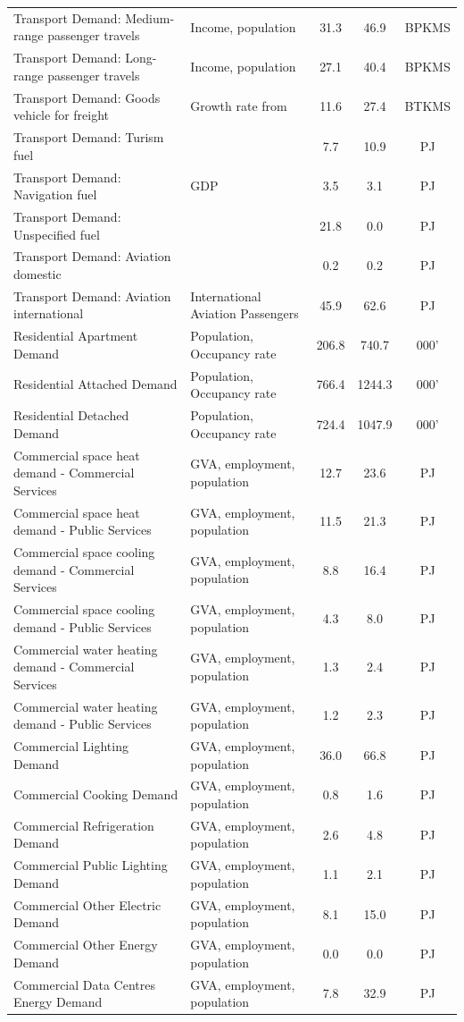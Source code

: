 \documentclass[journal abbreviation, manuscript]{copernicus}
\begin{document}
\begin{table}[htbp]
{\begin{tabular}{p{18em}lccc}
 Transport Demand: Medium-range passenger travels & Income, population & 31.3 & 46.9 & BPKMS \\
 Transport Demand: Long-range passenger travels & Income, population & 27.1 & 40.4 & BPKMS \\
 Transport Demand: Goods vehicle for freight & Growth rate from \cite{yan2020freight} & 11.6 & 27.4 & BTKMS \\
 Transport Demand: Turism fuel & & 7.7 & 10.9 & PJ \\
 Transport Demand: Navigation fuel & GDP & 3.5 & 3.1 & PJ \\
 Transport Demand: Unspecified fuel & & 21.8 & 0.0 & PJ \\
 Transport Demand: Aviation domestic & & 0.2 & 0.2 & PJ \\
 Transport Demand: Aviation international & International Aviation Passengers & 45.9 & 62.6 & PJ \\
 Residential Apartment Demand & Population, Occupancy rate & 206.8 & 740.7 & 000' \\
 Residential Attached Demand & Population, Occupancy rate & 766.4 & 1244.3 & 000' \\
 Residential Detached Demand & Population, Occupancy rate & 724.4 & 1047.9 & 000' \\
 Commercial space heat demand - Commercial Services & GVA, employment, population & 12.7 & 23.6 & PJ \\
 Commercial space heat demand - Public Services & GVA, employment, population & 11.5 & 21.3 & PJ \\
 Commercial space cooling demand - Commercial Services & GVA, employment, population & 8.8 & 16.4 & PJ \\
 Commercial space cooling demand - Public Services & GVA, employment, population & 4.3 & 8.0 & PJ \\
 Commercial water heating demand - Commercial Services & GVA, employment, population & 1.3 & 2.4 & PJ \\
 Commercial water heating demand - Public Services & GVA, employment, population & 1.2 & 2.3 & PJ \\
 Commercial Lighting Demand & GVA, employment, population & 36.0 & 66.8 & PJ \\
 Commercial Cooking Demand & GVA, employment, population & 0.8 & 1.6 & PJ \\
 Commercial Refrigeration Demand & GVA, employment, population & 2.6 & 4.8 & PJ \\
 Commercial Public Lighting Demand & GVA, employment, population & 1.1 & 2.1 & PJ \\
 Commercial Other Electric Demand & GVA, employment, population & 8.1 & 15.0 & PJ \\
 Commercial Other Energy Demand & GVA, employment, population & 0.0 & 0.0 & PJ \\
 Commercial Data Centres Energy Demand & GVA, employment, population & 7.8 & 32.9 & PJ \\ \hline
 \end{tabular}%
 }
 \label{tab:ESD_list}%
\end{table}%
\end{document}
